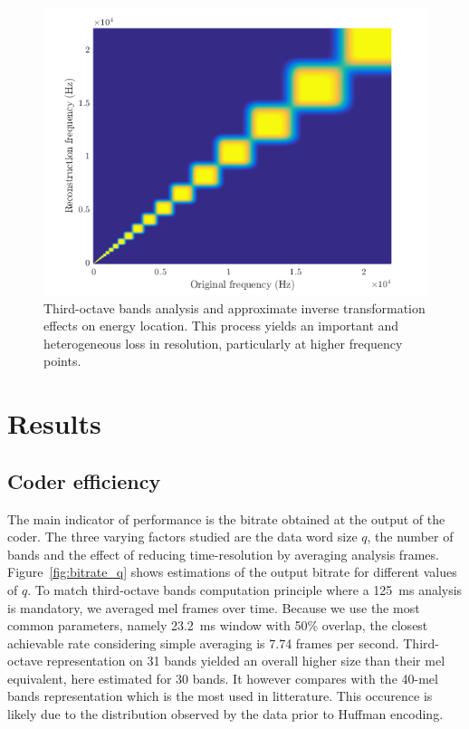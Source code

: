 \documentclass[final,3p,times,twocolumn]{elsarticle}
\begin{document}
\begin{figure}[htbp]
	\centering
		\includegraphics[width=\columnwidth]{figures/freq.png}
	\caption{Third-octave bands analysis and approximate inverse transformation effects on energy location. This process yields an important and heterogeneous loss in resolution, particularly at higher frequency points.}
	\label{fig:freq}
\end{figure}



\section{Results} \label{sec:results}

\subsection{Coder efficiency}

The main indicator of performance is the bitrate obtained at the output of the coder. The three varying factors studied are the data word size $q$, the number of bands and the effect of reducing time-resolution by averaging analysis frames. Figure~\ref{fig:bitrate_q} shows estimations of the output bitrate for different values of $q$. To match third-octave bands computation principle where a 125~ms analysis is mandatory, we averaged mel frames over time. Because we use the most common parameters, namely 23.2~ms window with 50\% overlap, the closest achievable rate considering simple averaging is 7.74 frames per second. Third-octave representation on 31 bands yielded an overall higher size than their mel equivalent, here estimated for 30 bands. It however compares with the 40-mel bands representation which is the most used in litterature. This occurence is likely due to the distribution observed by the data prior to Huffman encoding.
\end{document}
